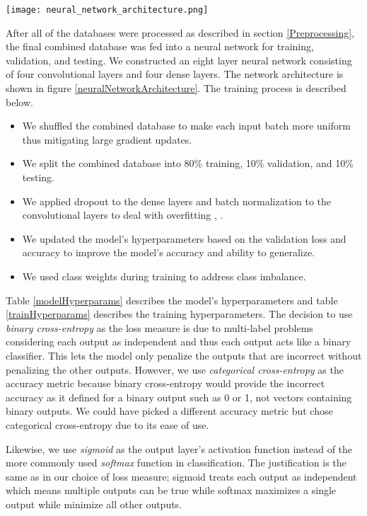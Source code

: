 \begin{figure*}
	\centering
	\hspace{6mm}
	\texttt{[image: neural\_network\_architecture.png]}
	\caption{Architecture for the SER network including the input layer and eight processing layers.}
	\label{neuralNetworkArchitecture}
\end{figure*}

After all of the databases were processed as described in section \ref{Preprocessing}, the final combined database was fed into a neural network for training, validation, and testing. We constructed an eight layer neural network consisting of four convolutional layers and four dense layers. The network architecture is shown in figure \ref{neuralNetworkArchitecture}. The training process is described below.
\begin{itemize}
	\item We shuffled the combined database to make each input batch more uniform thus mitigating large gradient updates.
	\item We split the combined database into 80\% training, 10\% validation, and 10\% testing.
	\item We applied dropout to the dense layers and batch normalization to the convolutional layers to deal with overfitting \cite{Srivastava2014}, \cite{Ioffe2015}.
	\item We updated the model's hyperparameters based on the validation loss and accuracy to improve the model's accuracy and ability to generalize.
	\item We used class weights during training to address class imbalance.
\end{itemize}

Table \ref{modelHyperparams} describes the model's hyperparameters and table \ref{trainHyperparams} describes the training hyperparameters. The decision to use \textit{binary cross-entropy} as the loss measure is due to multi-label problems considering each output as independent and thus each output acts like a binary classifier. This lets the model only penalize the outputs that are incorrect without penalizing the other outputs. However, we use \textit{categorical cross-entropy} as the accuracy metric because binary cross-entropy would provide the incorrect accuracy as it defined for a binary output such as 0 or 1, not vectors containing binary outputs. We could have picked a different accuracy metric but chose categorical cross-entropy due to its ease of use.

Likewise, we use \textit{sigmoid} as the output layer's activation function instead of the more commonly used \textit{softmax} function in classification. The justification is the same as in our choice of loss measure; sigmoid treats each output as independent which means multiple outputs can be true while softmax maximizes a single output while minimize all other outputs.


